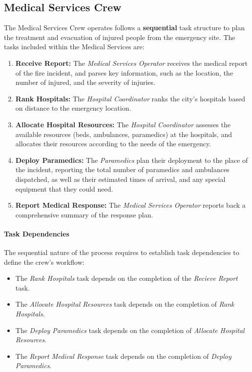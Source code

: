 \subsection{Medical Services Crew}

The Medical Services Crew operates follows a \textbf{sequential} task structure to plan the treatment and evacuation of injured people from the emergency site. The tasks included within the Medical Services are:

\begin{enumerate}
	\item \textbf{Receive Report:} The \textit{Medical Services Operator} receives the medical report of the fire incident, and parses key information, such as the location, the number of injured, and the severity of injuries.
	
	\item \textbf{Rank Hospitals:} The \textit{Hospital Coordinator} ranks the city's hospitals based on distance to the emergency location.

	\item \textbf{Allocate Hospital Resources:} The \textit{Hospital Coordinator} assesses the available resources (beds, ambulances, paramedics) at the hospitals, and allocates their resources according to the needs of the emergency.
	
	\item \textbf{Deploy Paramedics:} The \textit{Paramedics} plan their deployment to the place of the incident, reporting the total number of paramedics and ambulances dispatched, as well as their estimated times of arrival, and any special equipment that they could need.
	
	\item \textbf{Report Medical Response:} The \textit{Medical Services Operator} reports back a comprehensive summary of the response plan.
\end{enumerate}

\paragraph{Task Dependencies}
The sequential nature of the process requires to establish task dependencies to define the crew's workflow:
\begin{itemize}
	\item The \textit{Rank Hospitals} task depends on the completion of the \textit{Recieve Report} task.
	\item The \textit{Allocate Hospital Resources} task depends on the completion of \textit{Rank Hospitals}.
	\item The \textit{Deploy Paramedics} task depends on the completion of \textit{Allocate Hospital Resources}.
	\item The \textit{Report Medical Response} task depends on the completion of \textit{Deploy Paramedics}.
\end{itemize}

